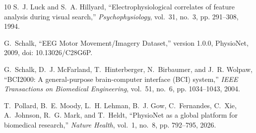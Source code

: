 \documentclass[conference]{IEEEtran}
\begin{document}
\begin{thebibliography}{10}
S.~J. Luck and S.~A. Hillyard, ``Electrophysiological correlates of feature
  analysis during visual search,'' \emph{Psychophysiology}, vol.~31, no.~3, pp.
  291--308, 1994.

G.~Schalk, ``{EEG} Motor Movement/Imagery Dataset,'' version 1.0.0, PhysioNet,
  2009, doi: 10.13026/C28G6P.

G.~Schalk, D.~J. McFarland, T.~Hinterberger, N.~Birbaumer, and J.~R. Wolpaw,
  ``{BCI2000}: A general-purpose brain-computer interface ({BCI}) system,''
  \emph{IEEE Transactions on Biomedical Engineering}, vol.~51, no.~6, pp.
  1034--1043, 2004.

T.~Pollard, B.~E. Moody, L.~H. Lehman, B.~J. Gow, C.~Fernandes, C.~Xie,
  A.~Johnson, R.~G. Mark, and T.~Heldt, ``{PhysioNet} as a global platform for
  biomedical research,'' \emph{Nature Health}, vol.~1, no.~8, pp. 792--795,
  2026.

\end{thebibliography}
\end{document}
